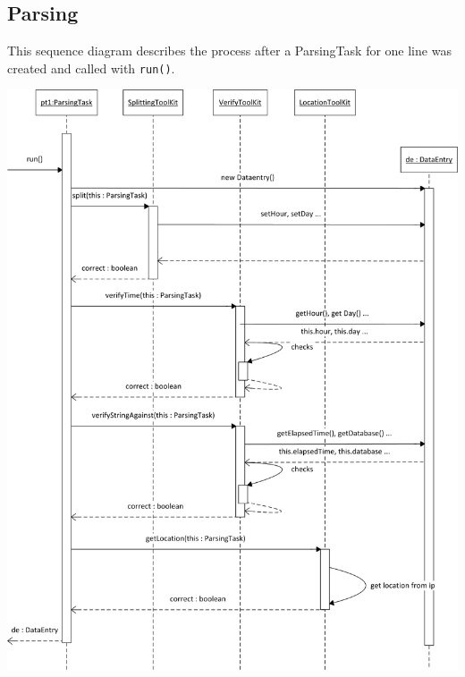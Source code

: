 \newpage 

\subsection{Parsing} 
This sequence diagram describes the process after a ParsingTask for one line was created and
called with \texttt{run()}. 

\begin{center}
\includegraphics[width=0.8\linewidth]{Pictures/Seq/SeqParser.png}
\end{center}



    
